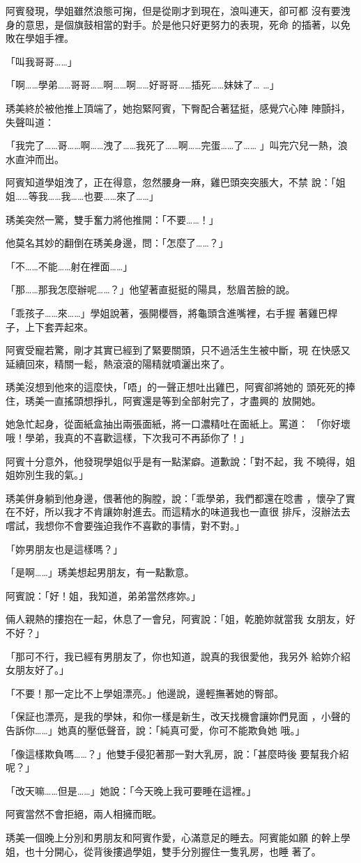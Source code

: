 阿賓發現，學姐雖然浪態可掬，但是從剛才到現在，浪叫連天，卻可都
沒有要洩身的意思，是個旗鼓相當的對手。於是他只好更努力的表現，死命
的插著，以免敗在學姐手裡。

「叫我哥哥……」

「啊……學弟……哥哥……啊……啊……好哥哥……插死……妹妹了…
…」

琇美終於被他推上頂端了，她抱緊阿賓，下臀配合著猛挺，感覺穴心陣
陣顫抖，失聲叫道：

「我完了……哥……啊……洩了……我死了……啊……完蛋……了……
」叫完穴兒一熱，浪水直沖而出。

阿賓知道學姐洩了，正在得意，忽然腰身一麻，雞巴頭突突脹大，不禁
說：「姐姐……等我……我……也要……來了……」

琇美突然一驚，雙手奮力將他推開：「不要……！」

他莫名其妙的翻倒在琇美身邊，問：「怎麼了……？」

「不……不能……射在裡面……」

「那……那我怎麼辦呢……？」他望著直挺挺的陽具，愁眉苦臉的說。

「乖孩子……來……」學姐說著，張開櫻唇，將龜頭含進嘴裡，右手握
著雞巴桿子，上下套弄起來。

阿賓受寵若驚，剛才其實已經到了緊要關頭，只不過活生生被中斷，現
在快感又延續回來，精關一鬆，熱滾滾的陽精就噴灑出來了。

琇美沒想到他來的這麼快，「唔」的一聲正想吐出雞巴，阿賓卻將她的
頭死死的捧住，琇美一直搖頭想掙扎，阿賓還是等到全部射完了，才盡興的
放開她。

她急忙起身，從面紙盒抽出兩張面紙，將一口濃精吐在面紙上。罵道：
「你好壞哦！學弟，我真的不喜歡這樣，下次我可不再舔你了！」

阿賓十分意外，他發現學姐似乎是有一點潔癖。道歉說：「對不起，我
不曉得，姐姐妳別生我的氣。」

琇美併身躺到他身邊，偎著他的胸膛，說：「乖學弟，我們都還在唸書
，懷孕了實在不好，所以我才不肯讓妳射進去。而這精水的味道我也一直很
排斥，沒辦法去嚐試，我想你不會要強迫我作不喜歡的事情，對不對。」

「妳男朋友也是這樣嗎？」

「是啊……」琇美想起男朋友，有一點歉意。

阿賓說：「好！姐，我知道，弟弟當然疼妳。」

倆人親熱的摟抱在一起，休息了一會兒，阿賓說：「姐，乾脆妳就當我
女朋友，好不好？」

「那可不行，我已經有男朋友了，你也知道，說真的我很愛他，我另外
給妳介紹女朋友好了。」

「不要！那一定比不上學姐漂亮。」他邊說，邊輕撫著她的臀部。

「保証也漂亮，是我的學妹，和你一樣是新生，改天找機會讓妳們見面
，小聲的告訴你……」她真的壓低聲音，說：「純真可愛，你可不能欺負她
哦。」

「像這樣欺負嗎……？」他雙手侵犯著那一對大乳房，說：「甚麼時後
要幫我介紹呢？」

「改天嘛……但是……」她說：「今天晚上我可要睡在這裡。」

阿賓當然不會拒絕，兩人相擁而眠。

琇美一個晚上分別和男朋友和阿賓作愛，心滿意足的睡去。阿賓能如願
的幹上學姐，也十分開心，從背後摟過學姐，雙手分別握住一隻乳房，也睡
著了。










